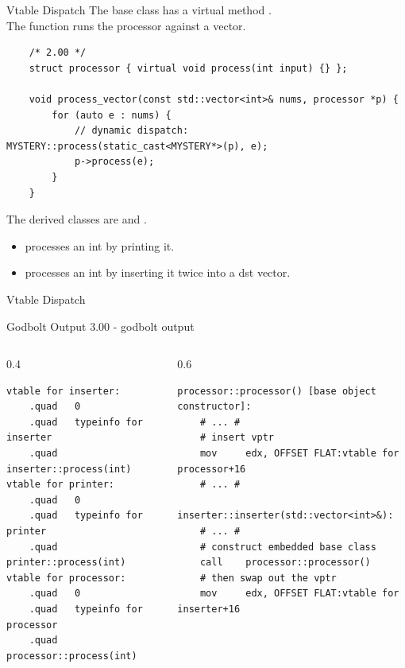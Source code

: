 \begin{frame}[fragile]{Vtable Dispatch}
  The base class  has a virtual method .\\
  The function  runs the processor against a vector.
  \begin{verbatim}
    /* 2.00 */
    struct processor { virtual void process(int input) {} };

    void process_vector(const std::vector<int>& nums, processor *p) {
        for (auto e : nums) {
            // dynamic dispatch: MYSTERY::process(static_cast<MYSTERY*>(p), e);
            p->process(e); 
        }
    }
  \end{verbatim}
  The derived classes are  and .
  \begin{itemize}
    \item {} processes an int by printing it.
    \item {} processes an int by inserting it twice into a dst vector.
  \end{itemize}
\end{frame}

\begin{frame}{Vtable Dispatch}
  
\end{frame}

\begin{frame}[fragile]{Godbolt Output}
  3.00 - godbolt output
  \begin{columns}[T]
    \begin{column}{0.4\textwidth}
\begin{verbatim}
vtable for inserter:
    .quad   0
    .quad   typeinfo for inserter
    .quad   inserter::process(int)
vtable for printer:
    .quad   0
    .quad   typeinfo for printer
    .quad   printer::process(int)
vtable for processor:
    .quad   0
    .quad   typeinfo for processor
    .quad   processor::process(int)
\end{verbatim}
    \end{column}
    \begin{column}{0.6\textwidth}
\begin{verbatim}
processor::processor() [base object constructor]:
    # ... #
    # insert vptr
    mov     edx, OFFSET FLAT:vtable for processor+16
    # ... #

inserter::inserter(std::vector<int>&):
    # ... #
    # construct embedded base class
    call    processor::processor()
    # then swap out the vptr
    mov     edx, OFFSET FLAT:vtable for inserter+16
\end{verbatim}
    \end{column}
  \end{columns}
\end{frame}

